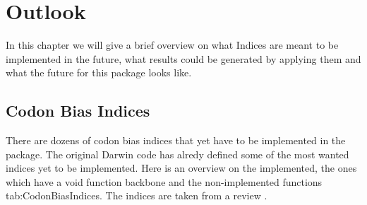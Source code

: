 \chapter{Outlook}
In this chapter we will give a brief overview on what Indices are meant to be implemented in the future, what results could be generated by applying them and what the future for this package looks like. 


\section{Codon Bias Indices}
There are dozens of codon bias indices that yet have to be implemented in the package. The original Darwin code has alredy defined some of the most wanted indices yet to be implemented. 
Here is an overview on the implemented, the ones which have a void function backbone and the non-implemented functions {tab:CodonBiasIndices}. The indices are taken from a review \cite{BinderCh13}.

